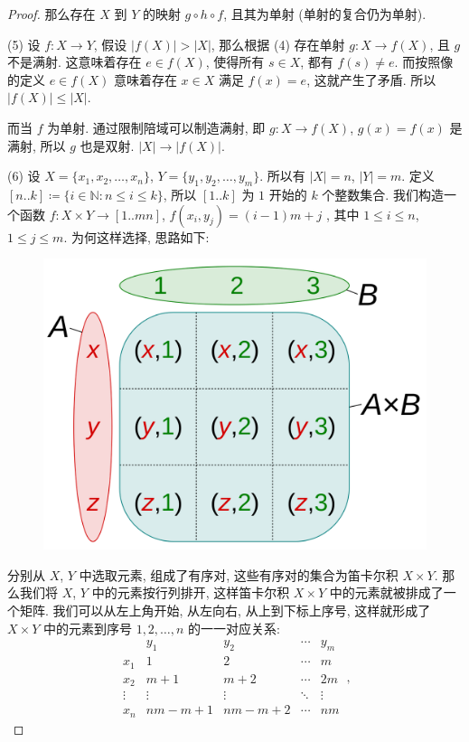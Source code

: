 \documentclass[UTF8]{ctexart}
\theoremstyle{mystyle}
\theoremstyle{myremark}
\theoremstyle{plain}
\newcommand{\N}{\mathbb N}
\newcommand{\set}[1]{\{#1\}}
\begin{document}
\begin{proof}
    那么存在 $ X $ 到 $ Y $ 的映射 $ g \circ h \circ f $, 且其为单射 (单射的复合仍为单射).

    (5) 设 $ f \colon X \to Y $, 假设 $ |f(X)| > |X| $, 那么根据 (4) 存在单射 $ g \colon X \to f(X) $, 且 $ g $ 不是满射. 这意味着存在 $ e \in f(X) $, 使得所有 $ s \in X $, 都有 $ f(s) \neq e $. 而按照像的定义 $ e \in f(X) $ 意味着存在 $ x \in X $ 满足 $ f(x) = e $, 这就产生了矛盾. 所以 $ |f(X)| \leqslant |X| $.

    而当 $ f $ 为单射. 通过限制陪域可以制造满射, 即 $ g \colon X \to f(X) $, $ g(x) = f(x) $ 是满射, 所以 $ g $ 也是双射. $ |X| \to |f(X)| $.

    (6) 设 $ X = \set{x_1, x_2, \dots, x_n} $, $ Y = \set{y_1, y_2, \dots, y_m} $. 所以有 $ |X| = n $, $ |Y| = m $. 定义 $ [n..k] \coloneqq \set{i \in \N \colon n \leqslant i \leqslant k} $, 所以 $ [1..k] $ 为 $ 1 $ 开始的 $ k $ 个整数集合. 我们构造一个函数 $ f \colon X \times Y \to [1..mn] $, $ f(x_i, y_j) = (i - 1) m + j $ , 其中 $ 1 \leqslant i \leqslant n $, $ 1 \leqslant j \leqslant m $. 为何这样选择, 思路如下:

    \begin{figure}[H]
        \centering
        \includegraphics[width = 0.4\linewidth]{./images/Cartesian_Product.png}
    \end{figure}
    
    分别从 $ X $, $ Y $ 中选取元素, 组成了有序对, 这些有序对的集合为笛卡尔积 $ X \times Y $. 那么我们将 $ X $, $ Y $ 中的元素按行列排开, 这样笛卡尔积 $ X \times Y $ 中的元素就被排成了一个矩阵. 我们可以从左上角开始, 从左向右, 从上到下标上序号, 这样就形成了 $ X \times Y $ 中的元素到序号 $ 1, 2, \dots, n $ 的一一对应关系:
    \[     
    \begin{matrix}
         & y_1 & y_2 & \cdots & y_m \\
        x_1 & 1 & 2 & \cdots & m \\
        x_2 & m + 1 & m + 2 & \cdots & 2m \\
        \vdots & \vdots & \vdots & \ddots & \vdots \\
        x_n & n m - m + 1 & n m - m + 2 & \cdots & n m
    \end{matrix} \,,
    \]


\end{proof}
\end{document}

